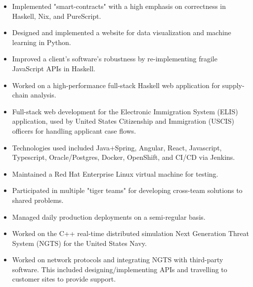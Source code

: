 \documentclass[10pt,a4paper,ragged2e,withhyper]{altacv}
\begin{document}
\begin{paracol}{2}



\begin{itemize}
    \item Implemented "smart-contracts" with a high emphasis on correctness in Haskell, Nix, and PureScript.
    \item Designed and implemented a website for data visualization and machine learning in Python.
    \item Improved a client's software's robustness by re-implementing fragile JavaScript APIs in Haskell.
    \item Worked on a high-performance full-stack Haskell web application for supply-chain analysis.
\end{itemize}

\divider


\begin{itemize}
    \item Full-stack web development for the Electronic Immigration System (ELIS) application, used by United States Citizenship and Immigration (USCIS) officers for handling applicant case flows.
    \item Technologies used included Java+Spring, Angular, React, Javascript, Typescript, Oracle/Postgres, Docker, OpenShift, and CI/CD via Jenkins.
    \item Maintained a Red Hat Enterprise Linux virtual machine for testing.
    \item Participated in multiple "tiger teams" for developing cross-team solutions to shared problems.
    \item Managed daily production deployments on a semi-regular basis.
\end{itemize}

\divider

\begin{itemize}
  \item Worked on the C++ real-time distributed simulation Next Generation Threat System (NGTS) for the United States Navy.
  \item Worked on network protocols and integrating NGTS with third-party software. This included designing/implementing APIs and travelling to customer sites to provide support.
\end{itemize}


\end{paracol}
\end{document}
